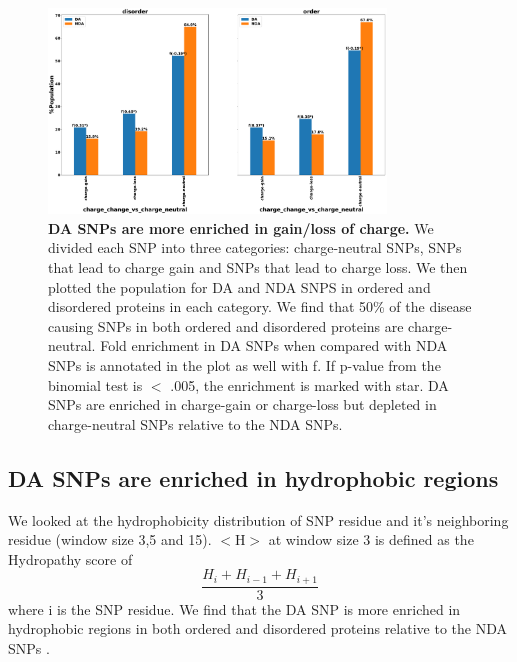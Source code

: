 \documentclass[10pt,letterpaper]{article}
\begin{document}
\begin{figure}[!ht]
\includegraphics[scale=0.1,width=0.8\textwidth,trim={0 0cm 0 0cm},clip]{./figures/charge_vs_no_charge_order_vs_disorder_SNP.pdf}
\caption{{\bf DA SNPs are more enriched in gain/loss of charge.} We divided each SNP into three categories: charge-neutral SNPs, SNPs that lead to charge gain and SNPs that lead to charge loss. We then plotted the population for DA and NDA SNPS in ordered and disordered proteins in each category. We find that 50\% of the disease causing SNPs in both ordered and disordered proteins are charge-neutral. Fold enrichment in DA SNPs when compared with NDA SNPs is annotated in the plot as well with f. If p-value from the binomial test is $<$ .005, the enrichment is marked with star. DA SNPs are enriched in charge-gain or charge-loss but depleted in charge-neutral SNPs relative to the NDA SNPs. }
\label{fig2} 
\end{figure}

\subsection*{DA SNPs are enriched in hydrophobic regions}
We looked at the hydrophobicity distribution of SNP residue and it's neighboring residue (window size 3,5 and 15). $<$H$>$ at window size 3 is defined as the Hydropathy score of \begin{equation}\frac{H_{i}+H_{i-1}+H_{i+1} }{3}\label{eq:bond}\end{equation}
 where i is the SNP residue. We find that the DA SNP is more enriched in hydrophobic regions in both ordered and disordered proteins relative to the NDA SNPs . 
\end{document}
